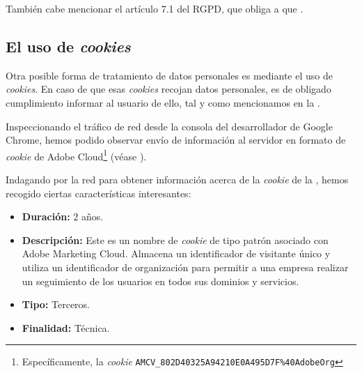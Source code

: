 
También cabe mencionar el artículo 7.1 del RGPD, que obliga a que .


\subsection{El uso de \textit{cookies}}
Otra posible forma de tratamiento de datos personales es mediante el uso de \textit{cookies}. En caso de que esas \textit{cookies} recojan datos personales, es de obligado cumplimiento informar al usuario de ello, tal y como mencionamos en la .

Inspeccionando el tráfico de red desde la consola del desarrollador de Google Chrome, hemos podido observar envío de información al servidor en formato de \textit{cookie} de Adobe Cloud\footnote{Específicamente, la \textit{cookie} \texttt{AMCV\_802D40325A94210E0A495D7F\%40AdobeOrg}} (véase ).


Indagando por la red para obtener información acerca de la \textit{cookie} de la , hemos recogido ciertas características interesantes:
\begin{itemize}
    \item \textbf{Duración:} 2 años.
    \item \textbf{Descripción:} Este es un nombre de \textit{cookie} de tipo patrón asociado con Adobe Marketing Cloud. Almacena un identificador de visitante único y utiliza un identificador de organización para permitir a una empresa realizar un seguimiento de los usuarios en todos sus dominios y servicios.
    \item \textbf{Tipo:} Terceros.
    \item \textbf{Finalidad:} Técnica.
\end{itemize}

